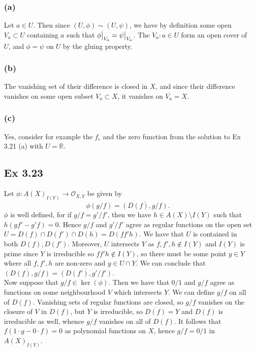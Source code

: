 \documentclass{article}
\newcommand\restr[2]{{%
  \left.\kern-\nulldelimiterspace %
  #1 %
  \vphantom{\big|} %
  \right|_{#2} %
  }}
\theoremstyle{definition}
\newcommand{\R}{\mathbb{R}}
\begin{document}
\subsubsection*{(a)} 

Let $a \in U$. Then since $(U, \phi) \sim (U, \psi)$, we have by definition
some open $V_a \subset U$ containing $a$ such that $\restr{\phi}{V_a} =
\restr{\psi}{V_a}$. The $V_a : a \in U$ form an open cover of $U$, and $\phi =
\psi$ on $U$ by the gluing property.

\subsubsection*{(b)} 

The vanishing set of their difference is closed in $X$, and since their
difference vanishes on some open subset $V_a \subset X$, it vanishes on
$\overline{V_a} = X$.

\subsubsection*{(c)} 

Yes, consider for example the $f_{\epsilon}$ and the zero function from the
solution to Ex 3.21 (a) with $U = \R$.

\subsection*{Ex 3.23} 

Let $\phi : A(X)_{I(Y)} \to \mathcal{O}_{X, Y}$ be given by
\[
	\phi(g/f) = \overline{\left(D(f), g/f \right)}.
\] 
$\phi$ is well defined, for if $g/f = g'/f'$, then we have $h \in A(X)
\setminus I(Y)$ such that $h(gf' - g'f) = 0$. Hence $g/f$ and $g'/f'$ agree as
regular functions on the open set $U = D(f) \cap D(f') \cap D(h) = D(ff'h)$. We
have that $U$ is contained in both $D(f), D(f')$. Moreover, $U$ intersects $Y$
as $f, f', h \not \in I(Y)$ and $I(Y)$ is prime since $Y$ is irreducible so
$ff'h \not \in I(Y)$, so there must be some point $y \in Y$ where all $f, f',
h$ are non-zero and $y \in U \cap Y$. We can conclude that
$\overline{\left(D(f), g/f\right)} = \overline{\left(D(f'), g'/f'\right)}$. \\

Now suppose that $g/f \in \ker(\phi)$. Then we have that $0/1$ and $g/f$ agree
as functions on some neighbourhood $V$ which intersects $Y$. We can define
$g/f$ on all of $D(f)$. Vanishing sets of regular functions are closed, so
$g/f$ vanishes on the closure of $V$ in $D(f)$, but $Y$ is irreducible, so
$\overline{D(f)} = Y$ and $D(f)$ is irreducible as well, whence $g/f$ vanishes
on all of $D(f)$. It follows that $f(1 \cdot g - 0 \cdot f) = 0$ as polynomial
functions on $X$, hence $g/f = 0/1$ in $A(X)_{I(Y)}$. \\
\end{document}
